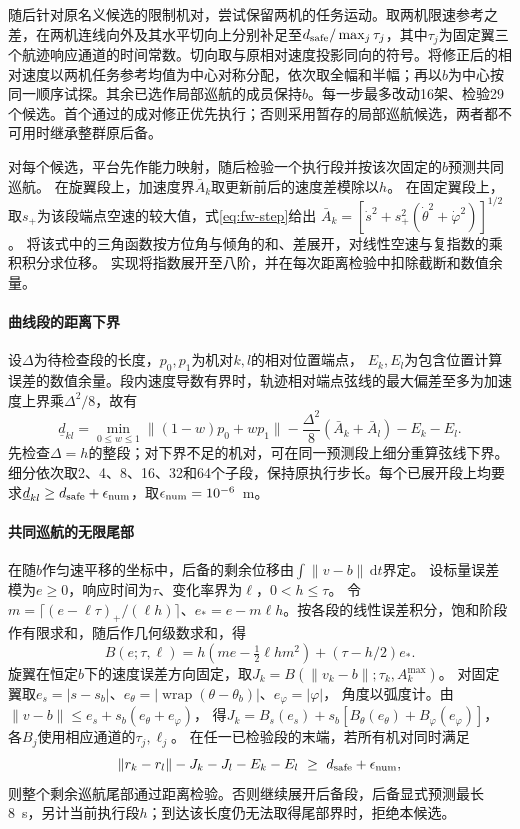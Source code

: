 \documentclass[UTF8,a4paper,11pt,fontset=none]{ctexart}
\begin{document}
随后针对原名义候选的限制机对，尝试保留两机的任务运动。取两机限速参考之差，在两机连线向外及其水平切向上分别补足至$d_{\rm safe}/\max_j\tau_j$，其中$\tau_j$为固定翼三个航迹响应通道的时间常数。切向取与原相对速度投影同向的符号。将修正后的相对速度以两机任务参考均值为中心对称分配，依次取全幅和半幅；再以$b$为中心按同一顺序试探。其余已选作局部巡航的成员保持$b$。每一步最多改动16架、检验29个候选。首个通过的成对修正优先执行；否则采用暂存的局部巡航候选，两者都不可用时继承整群原后备。

对每个候选，平台先作能力映射，随后检验一个执行段并按该次固定的$b$预测共同巡航。
在旋翼段上，加速度界$\bar A_k$取更新前后的速度差模除以$h$。
在固定翼段上，取$s_+$为该段端点空速的较大值，式\eqref{eq:fw-step}给出
$\bar A_k=[\dot s^2+s_+^2(\dot\theta^2+\dot\varphi^2)]^{1/2}$。
将该式中的三角函数按方位角与倾角的和、差展开，对线性空速与复指数的乘积积分求位移。
实现将指数展开至八阶，并在每次距离检验中扣除截断和数值余量。

\paragraph{曲线段的距离下界}
设$\Delta$为待检查段的长度，$p_0,p_1$为机对$k,l$的相对位置端点，
$E_k,E_l$为包含位置计算误差的数值余量。段内速度导数有界时，轨迹相对端点弦线的最大偏差至多为加速度上界乘$\Delta^2/8$，故有
\begin{equation}
\underline d_{kl}=\min_{0\le w\le1}\|(1-w)p_0+wp_1\|
-\frac{\Delta^2}{8}(\bar A_k+\bar A_l)-E_k-E_l .
\label{eq:segment-bound}
\end{equation}
先检查$\Delta=h$的整段；对下界不足的机对，可在同一预测段上细分重算弦线下界。
细分依次取2、4、8、16、32和64个子段，保持原执行步长。每个已展开段上均要求$\underline d_{kl}\ge d_{\rm safe}+\epsilon_{\rm num}$，取$\epsilon_{\rm num}=10^{-6}$~m。

\paragraph{共同巡航的无限尾部}
在随$b$作匀速平移的坐标中，后备的剩余位移由$\int\|v-b\|\,\mathrm dt$界定。
设标量误差模为$e\ge0$，响应时间为$\tau$、变化率界为$\ell$，$0<h\le\tau$。
令$m=\lceil(e-\ell\tau)_+/(\ell h)\rceil$、$e_*=e-m\ell h$。按各段的线性误差积分，饱和阶段作有限求和，随后作几何级数求和，得
\begin{equation}
B(e;\tau,\ell)=h(me-\tfrac12\ell h m^2)+(\tau-h/2)e_* .
\label{eq:braking-path}
\end{equation}
旋翼在恒定$b$下的速度误差方向固定，取$J_k=B(\|v_k-b\|;\tau_k,A_k^{\max})$。
对固定翼取$e_s=|s-s_b|$、$e_\theta=|\operatorname{wrap}(\theta-\theta_b)|$、$e_\varphi=|\varphi|$，
角度以弧度计。由$\|v-b\|\le e_s+s_b(e_\theta+e_\varphi)$，
得$J_k=B_s(e_s)+s_b[B_\theta(e_\theta)+B_\varphi(e_\varphi)]$，各$B_j$使用相应通道的$\tau_j,\ell_j$。
在任一已检验段的末端，若所有机对同时满足
\[
\|r_k-r_l\|-J_k-J_l-E_k-E_l\ \ge\ d_{\rm safe}+\epsilon_{\rm num},
\]
则整个剩余巡航尾部通过距离检验。否则继续展开后备段，后备显式预测最长8~s，另计当前执行段$h$；到达该长度仍无法取得尾部界时，拒绝本候选。
\end{document}
